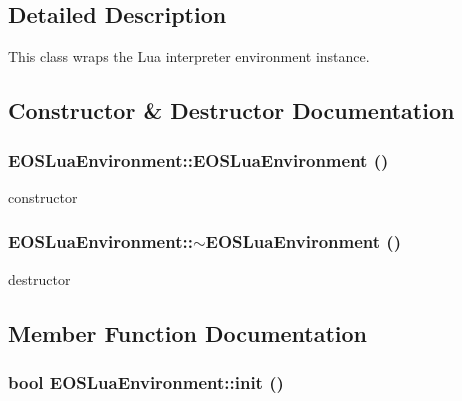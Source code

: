 \subsection{Detailed Description}
This class wraps the Lua interpreter environment instance. 

\subsection{Constructor \& Destructor Documentation}
\hypertarget{classEOSLuaEnvironment_9d99c0b601ab2e3e86c11b7410a00d26}{
\subsubsection[{EOSLuaEnvironment}]{\setlength{\rightskip}{0pt plus 5cm}EOSLuaEnvironment::EOSLuaEnvironment ()}}
\label{classEOSLuaEnvironment_9d99c0b601ab2e3e86c11b7410a00d26}


constructor 

\hypertarget{classEOSLuaEnvironment_d57156a90aff28c59db3fc756bed0d94}{
\subsubsection[{$\sim$EOSLuaEnvironment}]{\setlength{\rightskip}{0pt plus 5cm}EOSLuaEnvironment::$\sim$EOSLuaEnvironment ()}}
\label{classEOSLuaEnvironment_d57156a90aff28c59db3fc756bed0d94}


destructor 



\subsection{Member Function Documentation}
\hypertarget{classEOSLuaEnvironment_50fa986c464d28a30c07178165a9aa8c}{
\subsubsection[{init}]{\setlength{\rightskip}{0pt plus 5cm}bool EOSLuaEnvironment::init ()}}
\label{classEOSLuaEnvironment_50fa986c464d28a30c07178165a9aa8c}



